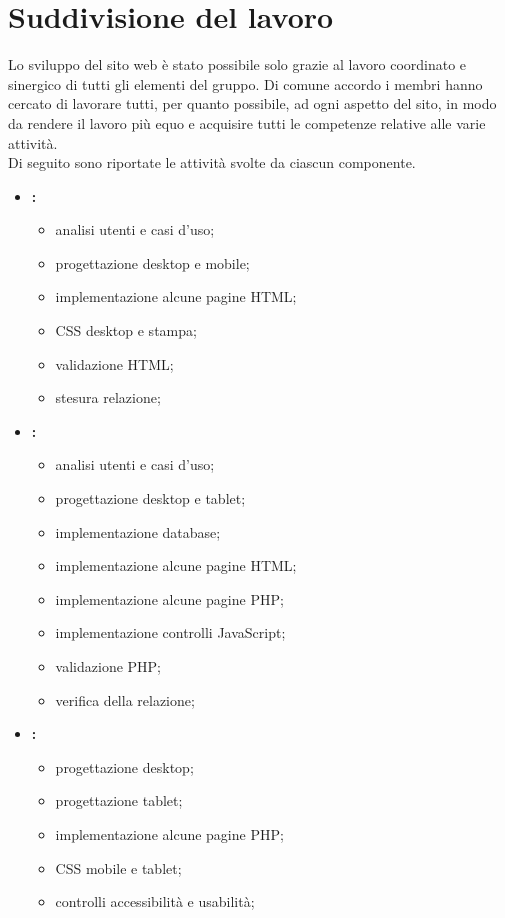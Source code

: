 \section{Suddivisione del lavoro}
\label{suddivisione-del-lavoro}
Lo sviluppo del sito web è stato possibile solo grazie al lavoro coordinato e sinergico di tutti gli elementi del gruppo. Di comune accordo i membri hanno cercato di lavorare tutti, per quanto possibile, ad ogni aspetto del sito, in modo da rendere il lavoro più equo e acquisire tutti le competenze relative alle varie attività. 
\\Di seguito sono riportate le attività svolte da ciascun componente.  
\begin{itemize}
	\item \textbf{\fiamma:}
		\begin{itemize}
			\item analisi utenti e casi d'uso;
			\item progettazione desktop e mobile;
			\item implementazione alcune pagine HTML;
			\item CSS desktop e stampa;
			\item validazione HTML;
			\item stesura relazione;
		\end{itemize}
	\item \textbf{\ludo:}
		\begin{itemize}
			\item analisi utenti e casi d'uso;
			\item progettazione desktop e tablet;
			\item implementazione database;
			\item implementazione alcune pagine HTML;
			\item implementazione alcune pagine PHP;
			\item implementazione controlli JavaScript;
			\item validazione PHP;
			\item verifica della relazione;
		\end{itemize}
	\item \textbf{\perin:}
		\begin{itemize}
			\item progettazione desktop;
			\item progettazione tablet;
			\item implementazione alcune pagine PHP;
			\item CSS mobile e tablet;
			\item controlli accessibilità e usabilità;

\end{itemize}
\end{itemize}
